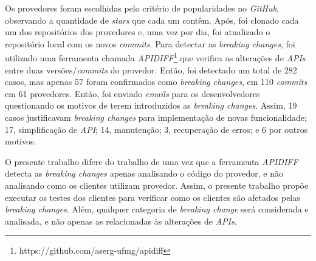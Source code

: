 Os provedores foram escolhidas pelo critério de popularidades no \textit{GitHub}, observando a quantidade de \textit{stars} que cada um contêm. Após, foi clonado cada um dos repositórios dos provedores e, uma vez por dia, foi atualizado o repositório local com os novos \textit{commits}. Para detectar as \textit{breaking changes}, foi utilizado uma ferramenta chamada \textit{APIDIFF}\footnote{https://github.com/aserg-ufmg/apidiff} que verifica as alterações de \textit{APIs} entre duas versões/\textit{commits} do provedor. Então, foi detectado um total de 282 casos, mas apenas 57 foram confirmados como \textit{breaking changes}, em 110 \textit{commits} em 61 provedores. Então, foi enviado \textit{emails} para os desenvolvedores questionando os motivos de terem introduzidos as \textit{breaking changes}. Assim, 19 casos justificavam \textit{breaking changes} para implementação de novas funcionalidade; 17, simplificação de \textit{API}; 14, manutenção; 3, recuperação de erros; e 6 por outros motivos.

O presente trabalho difere do trabalho de  uma vez que a ferramenta \textit{APIDIFF} detecta as \textit{breaking changes} apenas analisando o código do provedor, e não analisando como os clientes utilizam provedor. Assim, o presente trabalho propõe executar os testes dos clientes para verificar como os clientes são afetados pelas \textit{breaking changes}. Além, qualquer categoria de \textit{breaking change} será considerada e analisada, e não apenas as relacionadas às alterações de \textit{APIs}.